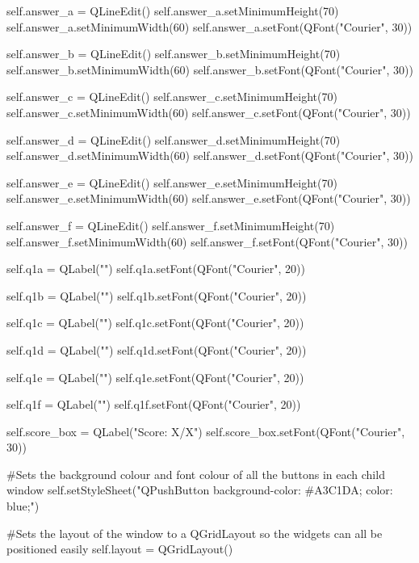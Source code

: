 \begin{landscape}
\begin{python}
        self.answer_a = QLineEdit()
        self.answer_a.setMinimumHeight(70)
        self.answer_a.setMinimumWidth(60)
        self.answer_a.setFont(QFont("Courier", 30))
        
        self.answer_b = QLineEdit()
        self.answer_b.setMinimumHeight(70)
        self.answer_b.setMinimumWidth(60)
        self.answer_b.setFont(QFont("Courier", 30))
        
        self.answer_c = QLineEdit()
        self.answer_c.setMinimumHeight(70)
        self.answer_c.setMinimumWidth(60)
        self.answer_c.setFont(QFont("Courier", 30))
        
        self.answer_d = QLineEdit()
        self.answer_d.setMinimumHeight(70)
        self.answer_d.setMinimumWidth(60)
        self.answer_d.setFont(QFont("Courier", 30))
        
        self.answer_e = QLineEdit()
        self.answer_e.setMinimumHeight(70)
        self.answer_e.setMinimumWidth(60)
        self.answer_e.setFont(QFont("Courier", 30))
        
        self.answer_f = QLineEdit()
        self.answer_f.setMinimumHeight(70)
        self.answer_f.setMinimumWidth(60)
        self.answer_f.setFont(QFont("Courier", 30))

        self.q1a = QLabel("")
        self.q1a.setFont(QFont("Courier", 20))
        
        self.q1b = QLabel("")
        self.q1b.setFont(QFont("Courier", 20))
        
        self.q1c = QLabel("")
        self.q1c.setFont(QFont("Courier", 20))
        
        self.q1d = QLabel("")
        self.q1d.setFont(QFont("Courier", 20))
        
        self.q1e = QLabel("")
        self.q1e.setFont(QFont("Courier", 20))
        
        self.q1f = QLabel("")
        self.q1f.setFont(QFont("Courier", 20))
        
        self.score_box = QLabel("Score: X/X")
        self.score_box.setFont(QFont("Courier", 30))

        #Sets the background colour and font colour of all the buttons in each child window
        self.setStyleSheet("QPushButton {background-color: #A3C1DA; color: blue;}")

        #Sets the layout of the window to a QGridLayout so the widgets can all be positioned easily
        self.layout = QGridLayout()


\end{python}
\end{landscape}
